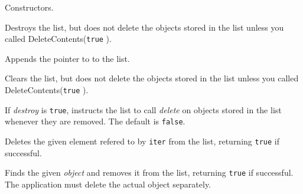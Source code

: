 \label{wxlistctor}



Constructors.

\label{wxlistdtor}


Destroys the list, but does not delete the objects stored in the list
unless you called DeleteContents({\tt true} ).

\label{wxlistappend}


Appends the pointer to  to the list.

\label{wxlistclear}


Clears the list, but does not delete the objects stored in the list
unless you called DeleteContents({\tt true} ).

\label{wxlistdeletecontents}


If {\it destroy} is {\tt true}, instructs the list to call {\it delete}
on objects stored in the list whenever they are removed.
The default is {\tt false}.

\label{wxlistdeletenode}


Deletes the given element refered to by {\tt iter} from the list, 
returning {\tt true} if successful.

\label{wxlistdeleteobject}


Finds the given {\it object} and removes it from the list, returning
{\tt true} if successful. The application must delete the actual object
separately.

\label{wxlisterase}


